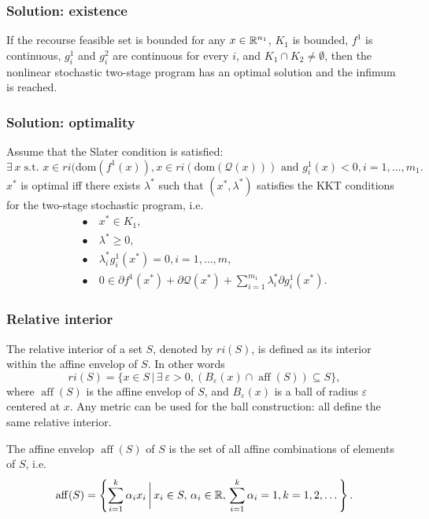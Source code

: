 \documentclass[french]{beamer}
\def\aff{\operatorname{aff}}
\begin{document}
\begin{frame}
\frametitle{Solution: existence}

\begin{theorem}
	If the recourse feasible set is bounded for any $x \in {\mathbb{R}}^{n_1}$, $K_1$ is bounded, $f^1$ is continuous, $g_i^1$ and $g_i^2$ are continuous for every $i$, and $K_1 \cap K_2 \ne \emptyset$,
	then the nonlinear stochastic two-stage program has an optimal solution and the infimum is reached.
\end{theorem}

\end{frame}

\begin{frame}
\frametitle{Solution: optimality}

\begin{theorem}
Assume that the Slater condition is satisfied:
$$
 \exists\, x \text{ s.t. } x \in ri(\mbox{dom}(f^1(x)), x \in ri(\mbox{dom}(\mathcal{Q}(x))) \text{ and } g_i^1(x) < 0, i = 1,\ldots,m_1.
$$
$x^*$ is optimal iff there exists $\lambda^*$ such that $(x^*, \lambda^*)$ satisfies the KKT conditions for the two-stage stochastic program, i.e.
\begin{align*}
\bullet\ & x^* \in K_1, \\
\bullet\ & \lambda^* \geq 0, \\ 
\bullet\ & \lambda_i^*g_i^1(x^*) = 0, i = 1,\ldots,m, \\
\bullet\ & 0 \in \partial f^1(x^*) + \partial \mathcal{Q}(x^*) +
 \sum_{i=1}^{m_1}\lambda_i^* \partial g_i^1(x^*).
\end{align*}
\end{theorem}

\end{frame}

\begin{frame}
	\frametitle{Relative interior}
	
	The {\red relative interior} of a set $S$, denoted by $ri(S)$, is defined as its interior within the affine envelop of $S$.
	In other words
	\[
	ri(S) = \lbrace x \in S \,|\, \exists\ \varepsilon > 0, (B_{\varepsilon}(x)
	\cap \aff(S)) \subseteq S \rbrace,
	\]
	where $\aff(S)$ is the {\red affine envelop} of $S$, and $B_{\varepsilon}(x)$
	is a ball of radius ${\varepsilon}$ centered at $x$.
	Any metric can be used for the ball construction: all define the same relative interior.
	
	\mbox{}
	
	The {\red affine envelop} $\aff(S)$ of $S$ is the set of all affine combinations of elements of $S$, i.e.
	\[
	\operatorname{aff} (S)=\left\lbrace \sum_{i=1}^k \alpha_i x_i \,\bigg|\,
	x_i\in S, \, \alpha_i\in {\mathbb{R}}, \, \sum_{i=1}^k \alpha_i=1,
	k=1, 2, \dots\right\rbrace. 
	\]
\end{frame}
\end{document}
